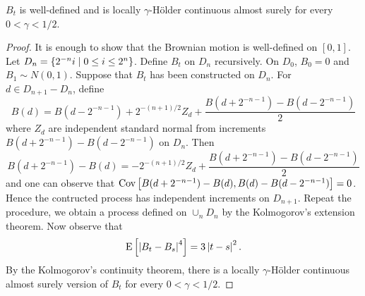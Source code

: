 \begin{corollary}
    $B_t$ is well-defined and is locally $\gamma$-H\"older 
    continuous almost surely for every $0<\gamma<1/2$. 
\end{corollary}
\begin{proof}
    It is enough to show that the Brownian motion is well-defined 
    on $[0,1]$. Let $D_n = \left\{ 2^{-n}i \;\middle\vert\; 0\leq i\leq 2^n \right\}$.  
    Define $B_t$ on $D_n$ recursively. On $D_0$, $B_0 = 0$ and 
    $B_1\sim N(0,1)$. Suppose that $B_t$ has been constructed 
    on $D_{n}$. For $d\in D_{n+1}-D_n$, define 
    \begin{equation*}
        B(d) = B(d-2^{-n-1}) + 2^{-(n+1)/2}Z_d + \frac{B(d+2^{-n-1})-B(d-2^{-n-1})}{2}
    \end{equation*}
    where $Z_d$ are independent standard normal from increments 
    $B(d+2^{-n-1})-B(d-2^{-n-1})$ on $D_n$. Then 
    \begin{equation*}
        B(d+2^{-n-1}) - B(d) = -2^{-(n+1)/2}Z_d + \frac{B(d+2^{-n-1})-B(d-2^{-n-1})}{2}
    \end{equation*}
    and one can observe that $\operatorname{Cov}\left[ {B(d+2^{-n-1}) - B(d), B(d) - B(d-2^{-n-1})} \right] = 0$. 
    Hence the contructed process has independent increments on $D_{n+1}$. 
    Repeat the procedure, we obtain a process defined on $\cup_n D_n$ 
    by the Kolmogorov's extension theorem. Now observe that 
    \begin{equation*}
        \operatorname{E}\left[ {\left\lvert {B_t-B_s} \right\rvert^4} \right] = 3\left\lvert {t-s} \right\rvert^2.
    \end{equation*}
    By the Kolmogorov's continuity theorem, there is a locally $\gamma$-H\"older 
    continuous almost surely version of $B_t$ for every $0<\gamma<1/2$. 
\end{proof}

